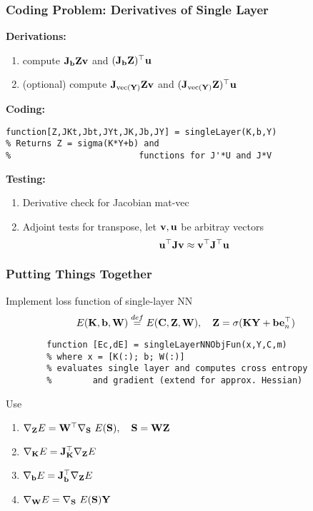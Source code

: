 \documentclass[12pt,fleqn,handout]{beamer}
\begin{document}
\begin{frame}[fragile]\frametitle{Coding Problem: Derivatives of Single Layer}

\textbf{Derivations:}
\begin{enumerate}
	
	\item compute ${\bf J}_{{\bf b}}{\bf Z} {\bf v}$ and $({\bf J}_{{\bf b}}{\bf Z})^\top {\bf u}$

	\item (optional) compute ${\bf J}_{{\rm vec}({\bf Y})}{\bf Z}  {\bf v}$ and $({\bf J}_{{\rm vec}({\bf Y})}{\bf Z})^\top  {\bf u}$
\end{enumerate}

\textbf{Coding:}
\begin{verbatim}
function[Z,JKt,Jbt,JYt,JK,Jb,JY] = singleLayer(K,b,Y)
% Returns Z = sigma(K*Y+b) and 
%                         functions for J'*U and J*V
\end{verbatim}

\textbf{Testing:}
\begin{enumerate}
	\item Derivative check for Jacobian mat-vec
	\item Adjoint tests for transpose, let ${\bf v},{\bf u}$ be arbitray vectors
	$$
		{\bf u}^\top {\bf J} {\bf v} \approx {\bf v}^\top {\bf J}^\top {\bf u}
	$$
\end{enumerate}

\end{frame}


\begin{frame}[fragile]
	\frametitle{Putting Things Together}
	
	Implement loss function of single-layer NN
	$$
		E({\bf K},{\bf b},{\bf W}) \stackrel{def}{=} E({\bf C},{\bf Z},{\bf W}), \quad {\bf Z} = \sigma({\bf K} {\bf Y}+{\bf b}{\bf e}_n^\top)
	$$
	
	
	\begin{verbatim}
		function [Ec,dE] = singleLayerNNObjFun(x,Y,C,m)
		% where x = [K(:); b; W(:)]
		% evaluates single layer and computes cross entropy 
		%        and gradient (extend for approx. Hessian)
	\end{verbatim}

	\bigskip
	
    Use
	\begin{enumerate}
		\item $\nabla_{{\bf Z}} E =  {\bf W}^\top \nabla_{{\bf S}} \ E({\bf S}), \quad {\bf S} = {\bf W}{\bf Z}$
		\item $\nabla_{{\bf K}} E =  {\bf J}_{{\bf K}}^\top \nabla_{{\bf Z}} E$
		\item $\nabla_{{\bf b}} E =  {\bf J}_{{\bf b}}^\top \nabla_{{\bf Z}} E$
		\item $\nabla_{\bfW} E =  \nabla_{\bfS} \ E(\bfS) \bfY $
	\end{enumerate}
	
	
\end{frame}
\end{document}
